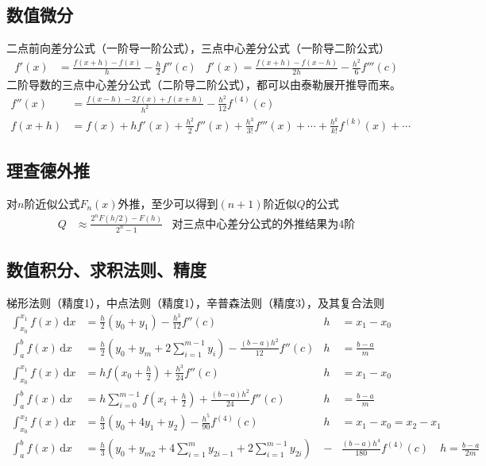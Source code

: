 \documentclass[twocolumn]{article}
\begin{document}
\subsection{数值微分}
二点前向差分公式（一阶导一阶公式），三点中心差分公式（一阶导二阶公式）
\begin{align*}
    f'(x) & =\frac{f(x+h)-f(x)}{h}-\frac{h}{2}f''(c) & f'(x)=\frac{f(x+h)-f(x-h)}{2h}-\frac{h^2}{6}f'''(c)
\end{align*}
二阶导数的三点中心差分公式（二阶导二阶公式），都可以由泰勒展开推导而来。
\begin{align*}
    f''(x) & =\frac{f(x-h)-2f(x)+f(x+h)}{h^2}-\frac{h^2}{12}f^{(4)}(c)                                     \\
    f(x+h) & =f(x)+hf'(x)+\frac{h^2}{2}f''(x)+\frac{h^3}{3!}f'''(x)+\cdots+\frac{h^k}{k!}f^{(k)}(x)+\cdots
\end{align*}

\subsection{理查德外推}
对$n$阶近似公式$F_n(x)$外推，至少可以得到$(n+1)$阶近似$Q$的公式
\begin{align*}
    Q &\approx \frac{2^nF(h/2)-F(h)}{2^n-1} & \text{对三点中心差分公式的外推结果为4阶}
\end{align*}

\subsection{数值积分、求积法则、精度}
梯形法则（精度1），中点法则（精度1），辛普森法则（精度3），及其复合法则
\begin{align*}
    \int_{x_0}^{x_1} f(x) \,\mathrm{d}x & = \frac{h}{2}(y_0+y_1)-\frac{h^3}{12}f''(c)                           & h & =x_1-x_0       \\
    \int_{a}^{b} f(x) \,\mathrm{d}x     & = \frac{h}{2}(y_0+y_m+2\sum_{i=1}^{m-1}y_i)-\frac{(b-a)h^2}{12}f''(c) & h & =\frac{b-a}{m}\\
    \int_{x_0}^{x_1} f(x) \,\mathrm{d}x & =hf(x_0+\frac{h}{2})+\frac{h^3}{24}f''(c)                       & h & =x_1-x_0       \\
    \int_{a}^{b} f(x) \,\mathrm{d}x     & =h\sum_{i=0}^{m-1}f(x_i+\frac{h}{2})+\frac{(b-a)h^2}{24}f''(c) & h & =\frac{b-a}{m}\\
    \int_{x_0}^{x_2} f(x) \,\mathrm{d}x & = \frac{h}{3}(y_0+4y_1+y_2)-\frac{h^5}{90}f^{(4)}(c)&h&=x_1-x_0 = x_2-x_1                                   \\
    \int_{a}^{b} f(x) \,\mathrm{d}x     & = \frac{h}{3}(y_0+y_{m2}+4\sum_{i=1}^{m}y_{2i-1}+2\sum_{i=1}^{m-1}y_{2i})&-&\frac{(b-a)h^4}{180}f^{(4)}(c)\quad h=\frac{b-a}{2m}
\end{align*}
\end{document}

